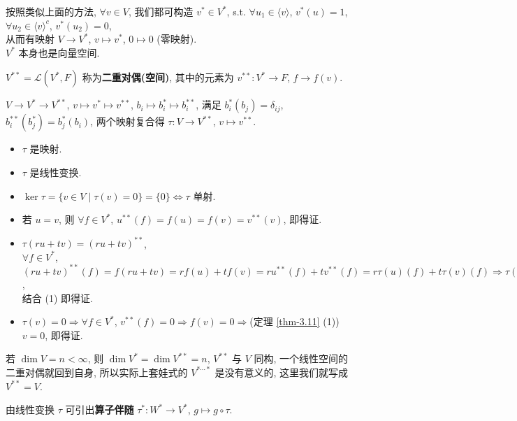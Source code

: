 \documentclass{note}
\begin{document}
按照类似上面的方法, $\forall v\in V$, 我们都可构造 $v^*\in V^*$, s.t. $\forall u_1\in\langle v\rangle$, $v^*(u)=1$, $\forall u_2\in\langle v\rangle^c$, $v^*(u_2)=0$,\\
从而有映射 $V\rightarrow V^*$, $v\mapsto v^*$, $0\mapsto 0$ (零映射).\\
$V^*$ 本身也是向量空间.

\begin{df}[二重对偶(空间)]
    $V^{**}=\mathcal{L}(V^*,F)$ 称为\textbf{二重对偶(空间)}, 其中的元素为 $v^{**}:V^*\rightarrow F$, $f\rightarrow f(v)$.
\end{df}

$V\rightarrow V^*\rightarrow V^{**}$, $v\mapsto v^*\mapsto v^{**}$, $b_i\mapsto b_i^*\mapsto b_i^{**}$, 满足 $b_i^*(b_j)=\delta_{ij}$, $b_i^{**}(b_j^*)=b_j^*(b_i)$, 两个映射复合得 $\tau:V\rightarrow V^{**}$, $v\mapsto v^{**}$.

\begin{itemize}
    \item[(1)] $\tau$ 是映射.
    \item[(2)] $\tau$ 是线性变换.
    \item[(3)] $\ker\tau=\{v\in V\mid\tau(v)=0\}=\{0\}\Longleftrightarrow\tau$ 单射.
\end{itemize}
\begin{pf}
    \begin{itemize}
        \item[(1)] 若 $u=v$, 则 $\forall f\in V^*$, $u^{**}(f)=f(u)=f(v)=v^{**}(v)$, 即得证.
        \item[(2)] $\tau(ru+tv)=(ru+tv)^{**}$,\\
        $\forall f\in V^*$, $(ru+tv)^{**}(f)=f(ru+tv)=rf(u)+tf(v)=ru^{**}(f)+tv^{**}(f)=r\tau(u)(f)+t\tau(v)(f)\Longrightarrow\tau(ru+tv)=r\tau(u)+t\tau(v)$,\\
        结合 (1) 即得证.
        \item[(3)] $\tau(v)=0\Longrightarrow\forall f\in V^*$, $v^{**}(f)=0\Longrightarrow f(v)=0\Longrightarrow$(定理 \ref{thm-3.11} (1)) $v=0$, 即得证.
    \end{itemize}
\end{pf}

\begin{cor}[(课本引理 3.13)]
    若 $\dim V=n<\infty$, 则 $\dim V^*=\dim V^{**}=n$, $V^{**}$ 与 $V$ 同构, 一个线性空间的二重对偶就回到自身, 所以实际上套娃式的 $V^{*\cdots*}$ 是没有意义的, 这里我们就写成 $V^{**}=V$.
\end{cor}

\begin{df}[算子伴随]
    由线性变换 $\tau$ 可引出\textbf{算子伴随} $\tau^*:W^*\rightarrow V^*$, $g\mapsto g\circ\tau$.
    \begin{center}
    \end{center}
\end{df}
\end{document}
